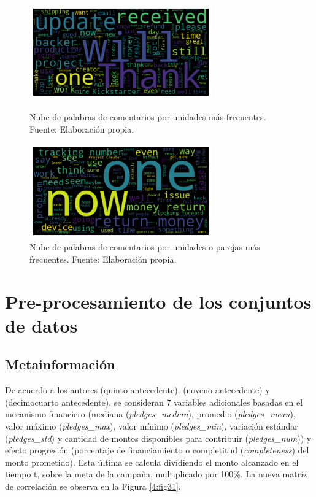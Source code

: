 \begin{figure}[htbp]
	\begin{center}
		\includegraphics[width=0.70\textwidth]{4/figures/comments_wordcloud_wordunit.png}
		\caption{Nube de palabras de comentarios por unidades más frecuentes. Fuente: Elaboración propia.}
		\label{4:fig29}
		
		\includegraphics[width=0.70\textwidth]{4/figures/comments_wordcloud_wordcouple.png}
		\caption{Nube de palabras de comentarios por unidades o parejas más frecuentes. Fuente: Elaboración propia.}
		\label{4:fig30}
	\end{center}
\end{figure}

\section{Pre-procesamiento de los conjuntos de datos}

\subsection{Metainformación}
De acuerdo a los autores \citeauthor{pr_chen2015predcrowd} (quinto antecedente), \citeauthor{pr_jin2019dayssuccess} (noveno antecedente) y \citeauthor{pr_chen2013kickpredict} (decimocuarto antecedente), se consideran 7 variables adicionales basadas en el mecanismo financiero (mediana (\textit{pledges\_median}), promedio (\textit{pledges\_mean}), valor máximo (\textit{pledges\_max}), valor mínimo (\textit{pledges\_min}), variación estándar (\textit{pledges\_std}) y cantidad de montos disponibles para contribuir (\textit{pledges\_num})) y efecto progresión (porcentaje de financiamiento o completitud (\textit{completeness}) del monto prometido). Esta última se calcula dividiendo el monto alcanzado en el tiempo t, sobre la meta de la campaña, multiplicado por 100\%. La nueva matriz de correlación se observa en la Figura \ref{4:fig31}.


